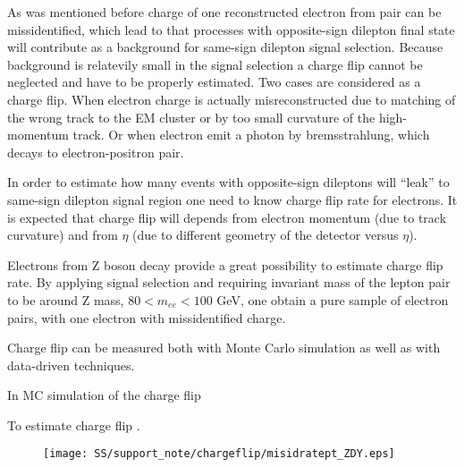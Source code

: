 As was mentioned before charge of one reconstructed electron from pair can be missidentified, which lead to that
processes with opposite-sign dilepton final state will contribute as a background for same-sign dilepton signal selection.
Because background is relatevily small in the signal selection a charge flip cannot be neglected and have to be properly estimated. Two cases are considered as a charge flip. When electron charge is actually misreconstructed due to matching of the wrong track to the EM cluster or by too small curvature of the high-momentum track. Or when electron emit a photon by bremsstrahlung, which decays to electron-positron pair. 

In order to estimate how many events with opposite-sign dileptons will ``leak'' to same-sign dilepton signal region one
need to know charge flip rate for electrons. It is expected that charge flip will depends from electron momentum (due to track curvature) and from $\eta$ (due to different geometry of the detector versus $\eta$).

Electrons from Z boson decay provide a great possibility to estimate charge flip rate. By applying signal selection
and requiring invariant mass of the lepton pair to be around Z mass, $80 < m_{ee} < 100$ GeV, one obtain a pure
sample of electron pairs, with one electron with missidentified charge. 


Charge flip can be measured both with Monte Carlo simulation as well as with data-driven techniques.


In  MC simulation of the charge flip \toDo 


To estimate charge flip \toDo.

\begin{figure}
\begin{center}
 \texttt{[image: SS/support\_note/chargeflip/misidratept\_ZDY.eps]}
\caption{\toDo[caption]}
\label{fig:chargeFlip_structure}
\end{center}
\end{figure}











